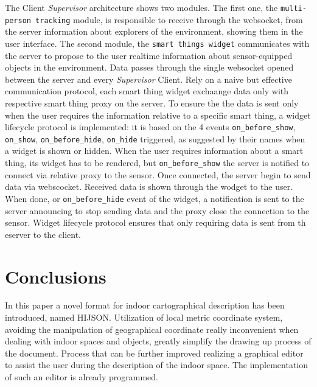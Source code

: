\documentclass{sig-alternate}
\begin{document}
The Client \emph{Supervisor} architecture shows two modules. The first
one, the \texttt{multi-person\ tracking} module, is responsible to
receive through the websocket, from the server information about
explorers of the environment, showing them in the user interface. The
second module, the \texttt{smart\ things\ widget} communicates with the
server to propose to the user realtime information about sensor-equipped
objects in the environment. Data passes through the single websocket
opened between the server and every \emph{Supervisor} Client. Rely on a
naive but effective communication protocol, each smart thing widget
exchaange data only with respective smart thing proxy on the server. To
ensure the the data is sent only when the user requires the information
relative to a specific smart thing, a widget lifecycle protocol is
implemented: it is based on the 4 events \texttt{on\_before\_show},
\texttt{on\_show}, \texttt{on\_before\_hide}, \texttt{on\_hide}
triggered, as suggested by their names when a widget is shown or hidden.
When the user requires information about a smart thing, its widget has
to be rendered, but \texttt{on\_before\_show} the server is notified to
connect via relative proxy to the sensor. Once connected, the server
begin to send data via webscocket. Received data is shown through the
wodget to the user. When done, or \texttt{on\_before\_hide} event of the
widget, a notification is sent to the server announcing to stop sending
data and the proxy close the connection to the sensor. Widget lifecycle
protocol ensures that only requiring data is sent from th eserver to the
client.

\section{Conclusions}\label{conclusions}

In this paper a novel format for indoor cartographical description has been introduced, named HIJSON. Utilization of local metric coordinate system, avoiding the manipulation of geographical coordinate really inconvenient when dealing with indoor spaces and objects, greatly simplify the drawing up process of the document. Process that can be further improved realizing a graphical editor to assist the user during the description of the indoor space. The implementation of such an editor is already programmed.
\end{document}
